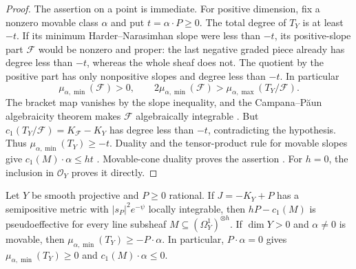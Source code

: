 \begin{proof}
The assertion on a point is immediate. For positive dimension,
fix a nonzero movable class $\alpha$ and put $t=\alpha\cdot P\geq0$.
The total degree of $T_Y$ is at least $-t$.  If its minimum
Harder--Narasimhan slope were less than $-t$, its positive-slope part
$\mathcal F$ would be nonzero and proper: the last negative graded piece
already has degree less than $-t$, whereas the whole sheaf does not.
The quotient by the positive part has only nonpositive slopes and degree
less than $-t$.  In particular
\[
 \mu_{\alpha,\min}(\mathcal F)>0,\qquad
 2\mu_{\alpha,\min}(\mathcal F)>
       \mu_{\alpha,\max}(T_Y/\mathcal F).
\]
The bracket map vanishes by the slope inequality, and the
Campana--P\u aun algebraicity theorem makes $\mathcal F$ algebraically
integrable \cite[Proposition~2.2]{Ou2023}.  But
$c_1(T_Y/\mathcal F)=K_{\mathcal F}-K_Y$ has degree less than $-t$,
contradicting the hypothesis.  Thus
$\mu_{\alpha,\min}(T_Y)\geq-t$.
Duality and the tensor-product rule for movable slopes give
$c_1(M)\cdot\alpha\leq ht$ \cite{GKP2016,CampanaPaun2019}.
Movable-cone duality proves the assertion \cite{BDPP2013}.
For $h=0$, the inclusion in $\mathcal O_Y$ proves it directly.
\end{proof}

\begin{proposition}
\label{g:bt:weighted-slope}\label{g:slope-recalled}\label{rb:cotangent}
Let $Y$ be smooth projective and $P\geq0$ rational.  If $J=-K_Y+P$
has a semipositive metric with $|s_P|^2e^{-\psi}$ locally integrable, then
$hP-c_1(M)$ is pseudoeffective for every line subsheaf
$M\subseteq(\Omega_Y^1)^{\otimes h}$.
If $\dim Y>0$ and $\alpha\ne0$ is movable, then
$\mu_{\alpha,\min}(T_Y)\geq-P\cdot\alpha$. In particular,
$P\cdot\alpha=0$ gives $\mu_{\alpha,\min}(T_Y)\geq0$ and
$c_1(M)\cdot\alpha\leq0$.
\end{proposition}

